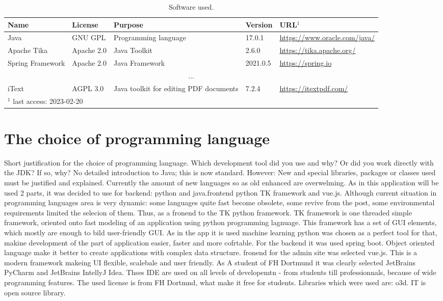 \documentclass[12pt]{report}           %
\theoremstyle{thesis}        %
\begin{document}
	\begin{table}
		\caption{Software used.}
		\label{TAB:Software}
		\begin{tabular}{|p{2cm}|p{2cm}|p{3.4cm}|p{1.5cm}|p{3cm}|}
			\hline
			Name&License&Purpose&Version&URL$^1$\\
			\hline
			Java&GNU GPL&Programming language&17.0.1&\url{https://www.oracle.com/java/}\\
			Apache Tika&Apache 2.0&Java Toolkit &2.6.0&\url{https://tika.apache.org/}\\
			Spring Framework&Apache 2.0&Java Framework&2021.0.5&\url{https://spring.io}\\
			\multicolumn{5}{|c|}{...}\\
			iText&AGPL 3.0&Java toolkit for editing PDF documents&7.2.4&\url{https://itextpdf.com/}\\
			\hline
			\multicolumn{5}{l}{$^1$ last access: 2023-02-20}
		\end{tabular}
	\end{table}
	
	\section{The choice of programming language}

	Short justification for the choice of programming language. Which development tool did you use and why? Or did you work directly with the JDK? If so, why? No detailed introduction to Java; this is now standard. However: New and special libraries, packages or classes used must be justified and explained.
	Currently the amount of new languages so as old enhanced are overwelming. As in this application will be used  2 parts, it was decided to use for backend: python and java.frontend python TK framework and vue.js.
	Although current situation in programming languages area is very dynamic: some languages quite fast become obsolete, some revive from the post, some environmental requirements limited the selecion of them. Thus, as a fronend to the TK python framework. TK framework is one threaded simple framework, oriented onto fast modeling of an application using python programming lagnuage. This framework has a set of GUI elements, which mostly are enough to bild user-friendly GUI. As in the app it is used machine learning python was chosen as a perfect tool for that, makine development of the part of application easier, faster and more cofrtable. For the backend it was used spring boot.  Object oriented language make it better to create applications with complex data structure. fronend for the admin site was selected vue.js. This is a modern framework makeing UI flexible, scalebale and user friendly. As A student of FH Dortmund it was clearly selected JetBrains PyCharm and JetBrains IntellyJ Idea. Thses IDE are used on all levels of developemtn - from students till professionnals, because of wide programming features. The used license is from FH Dortmnd, what make it free for students. 
	Libraries which were used are:
	o3d. IT is open source library. 
	
\end{document}
